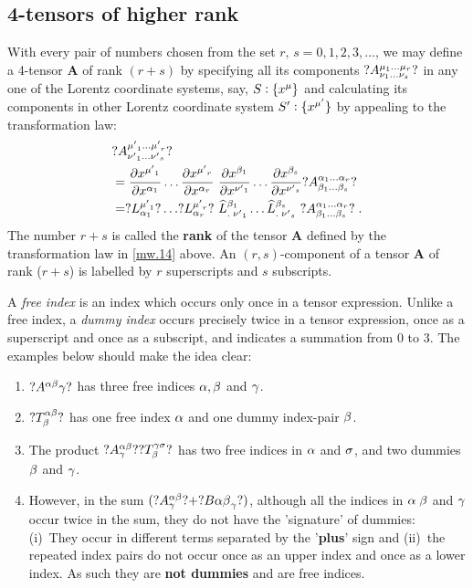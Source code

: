 \subsection{4-tensors of higher rank}

 With every pair of numbers 
chosen from the set $r,\,s=0,1,2,3,\dots$, we may 
define a 4-tensor $\mathbf{A}$  of rank $(r+s)$ by 
specifying all its components $?A^{{{\mu}_1}\dots 
{\ensuremath{{\mu}}_r}}_{{{\nu}_1}\dots {\ensuremath{{\nu}}_s}}?$ in any one of the  
Lorentz coordinate systems, say, $S:\{x^{{\mu}}\}$ and 
calculating  its components in other Lorentz 
coordinate system $S':\{x^{{\mu'}}\}$ by appealing to the 
transformation law: 
\begin{align}\label{mw.14}
&?A^{{{\mu'}_1}\dots {\ensuremath{{\mu'}}_r}}_{{{\nu'}_1}\dots
{\ensuremath{{\nu'}}_s}}?\notag\\
&=\frac{{\partial} x^{{\mu'}_1}} {{\partial} x^{{\alpha}_1}} 
\dots\frac{{\partial} x^{{\mu'}_r}}{{\partial} x^{{\alpha}_r}} \,\,
\frac{{\partial} x^{{\beta}_1}}{{\partial} x^{{\nu'}_1}}\dots
\frac{{\partial} x^{{\beta}_s}} {{\partial} x^{{\nu'}_s}} 
?A^{{{\alpha}_1}\dots
{\ensuremath{{\alpha}}_r}}_{{{\beta}_1}\dots {\ensuremath{{\beta}}_s}}? \notag\\
&= ?L^{{\mu'}_1}_{{\alpha}_1}?\dots ?L^{{\mu'}_r}_{{\alpha}_r}?
\,\,{{{\widehat{L}}}^{{\beta}_1}_{.\;{\nu'}_1}} \dots
{\ensuremath{{{\widehat{L}}}^{{\beta}_s}_{.\;{\nu'}_s}}}\,\,?A^{{{\alpha}_1}\dots 
{\ensuremath{{\alpha}}_r}}_{{{\beta}_1}\dots {\ensuremath{{\beta}}_s}}?\;.
\end{align}
 \dfnb The number $r+s$ is called the \textbf{rank} of 
the tensor $\mathbf{A}$ defined by the transformation 
law in \eqref{mw.14} above. An $(r,s)$-component of a 
tensor $\mathbf{A}$ of rank ($r+s$) is labelled by $r$ 
superscripts and $s$ subscripts. 

 A \textit{free index} is an index which occurs 
only once in a tensor expression. Unlike a free index, 
a \textit{dummy index} occurs precisely twice in a 
tensor expression, once as a superscript and once as a 
subscript, and indicates a summation from 0 to 3. The 
examples below should make the idea clear:
\begin{enumerate}
\item $?A^{{\alpha}{\beta}}{{\gamma}}?$ has three free indices 
${\alpha},{\beta}$ and ${\gamma}$. \item $?T^{{\alpha}{\beta}}_{{\beta}}?$  
has one free index ${\alpha}$ and one dummy index-pair  
${\beta}$.
\item The product $?A^{{\alpha}{\beta}}_{{\gamma}}? 
?T^{{\gamma}{\sigma}}_{{\beta}}?$        has two  free indices in 
${\alpha}$   and ${\sigma}$, and two dummies ${\beta}$ and ${\gamma}$. 
\item However, in the sum $(?A^{{\alpha}{\beta}}_{{\gamma}}? 
+?B{{\alpha}{\beta}}_{{\gamma}}?) $, although all the indices in 
${\alpha}\;{\beta}$ and ${\gamma}$ occur twice in the sum, they do 
not have the 'signature' of dummies: (i)~They occur in 
different terms separated by the '\textbf{plus}' sign 
and (ii)~the repeated index pairs do not occur once as 
an upper index and once as a lower index. As such they 
are  \textbf{not dummies} and are free indices.
\end{enumerate}

